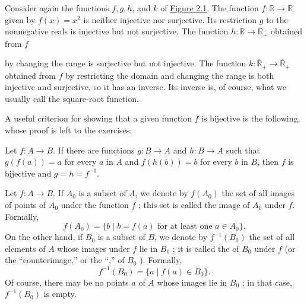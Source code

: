 \begin{centeredblock}
 \begin{example}
\label{ex:\thesection.\theexample}
 Consider again the functions \(f,g,h\), and \(k\) of \hyperref[fig:2.1]{Figure 2.1}. The function \(f : \mathbb{R} \rightarrow \mathbb{R}\) given by \(f(x) = x^{2}\) is neither injective nor surjective. Its restriction \(g\) to the nonnegative reals is injective but not surjective. The function \(h : \mathbb{R} \rightarrow {\mathbb{R}}_{+}\) obtained from \(f\)

 by changing the range is surjective but not injective. The function \(k : {\overline{\mathbb{R}}}_{+} \rightarrow {\overline{\mathbb{R}}}_{+}\) obtained from \(f\) by restricting the domain and changing the range is both injective and surjective, so it has an inverse. Its inverse is, of course, what we usually call the square-root function.
 \end{example}
\end{centeredblock}

A useful criterion for showing that a given function \(f\) is bijective is the following, 
whose proof is left to the exercises:

\begin{lemma}
\label{lem:\thetheorem}
 Let \(f : A \rightarrow B\). If there are functions \(g : B \rightarrow A\) and \(h : B \rightarrow A\) such that \(g({f(a) }) = a\) for every \(a\) in \(A\) and \(f({h(b) }) = b\) for every \(b\) in \(B\), then \(f\) is bijective and \(g = h = f^{-1}\).
\end{lemma}

\begin{definition}
 Let \(f : A \rightarrow B\). If \(A_{0}\) is a subset of \(A\), we denote by \(f(A_{0})\) the set of all images of points of \(A_{0}\) under the function \(f\) ; this set is called the image of \(A_{0}\) under \(f\). Formally,
 \[
 f(A_{0}) = \{ {b \mid b = f(a) \text{ for at least one }a \in {A}_{0}}\} .
 \]
 On the other hand, if \(B_{0}\) is a subset of \(B\), we denote by \(f^{-1}(B_{0})\) the set of all elements of \(A\) whose images under \(f\) lie in \(B_{0}\) ; it is called the  of \(B_{0}\) under \(f\) (or the ``counterimage,'' or the ``,'' of \(B_{0}\) ). Formally,
 \[
 f^{-1}(B_{0}) = \{ {a \mid f(a) \in {B}_{0}}\} .
 \]
 Of course, there may be no points \(a\) of \(A\) whose images lie in \(B_{0}\) ; in that case, \(f^{-1}(B_{0})\) is empty.
\end{definition}

